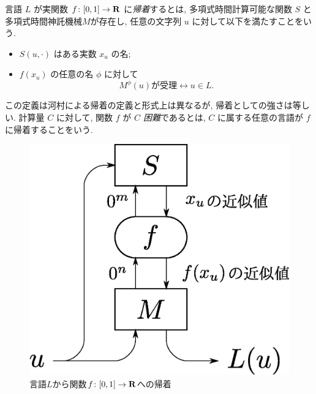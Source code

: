  \begin{definition}[帰着]
  言語 $L$ が実関数 $f\colon [0,1] \to \mathbf R$ に\emph{帰着}するとは, 
  多項式時間計算可能な関数 $S$ と多項式時間神託機械$M$が存在し, 
  任意の文字列 $u$ に対して以下を満たすことをいう. 
  \begin{itemize}
   \item $S(u, \cdot)$ はある実数 $x_u$ の名;
   \item $f(x_u)$ の任意の名 $\phi$ に対して
	 \[
	  M^\phi(u) \text{が受理} \leftrightarrow u \in L.
	 \]
  \end{itemize}
 \end{definition}
 この定義は河村による帰着の定義と形式上は異なるが,
 帰着としての強さは等しい.
 計算量 $C$ に対して, 関数 $f$ が \emph{$C$ 困難}であるとは,
 $C$ に属する任意の言語が $f$ に帰着することをいう.

 \begin{figure}
  \begin{center}
  \includegraphics[scale=0.25]{image/reduction.eps}
  \caption{言語$L$から関数$f \colon [0,1] \to \mathbf R$への帰着}
  \label{fig:reduction}
  \end{center}
 \end{figure}
